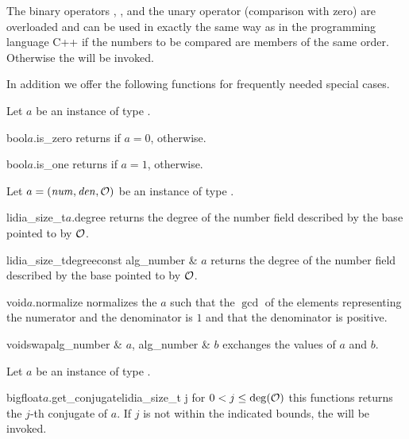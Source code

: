 The binary operators \code{==}, \code{!=}, and the unary operator \code{!}  (comparison with
zero) are overloaded and can be used in exactly the same way as in the programming language C++
if the numbers to be compared are members of the same order.  Otherwise the \LEH will be
invoked.

In addition we offer the following functions for frequently needed special cases.

Let $a$ be an instance of type .

\begin{cfcode}{bool}{$a$.is_zero}{}
  returns \TRUE if $a = 0$, \FALSE otherwise.
\end{cfcode}

\begin{cfcode}{bool}{$a$.is_one}{}
  returns \TRUE if $a = 1$, \FALSE otherwise.
\end{cfcode}



\BASIC

Let $a = (\mathit{num}, \mathit{den}, \mathcal{O})$ be an instance of type .

\begin{cfcode}{lidia_size_t}{$a$.degree}{}
  returns the degree of the number field described by the base pointed to by $\mathcal{O}$.
\end{cfcode}

\begin{fcode}{lidia_size_t}{degree}{const alg_number & $a$}
  returns the degree of the number field described by the base pointed to by $\mathcal{O}$.
\end{fcode}

\begin{fcode}{void}{$a$.normalize}{}
  normalizes the  $a$ such that the $\gcd$ of the elements representing the
  numerator and the denominator is $1$ and that the denominator is positive.
\end{fcode}

\begin{fcode}{void}{swap}{alg_number & $a$, alg_number & $b$}
  exchanges the values of $a$ and $b$.
\end{fcode}



\HIGH

Let $a$ be an instance of type .

\begin{cfcode}{bigfloat}{$a$.get_conjugate}{lidia_size_t j}
  for $0 < j \leq \deg(\mathcal{O})$ this functions returns the $j$-th conjugate of $a$.  If $j$ is not
  within the indicated bounds, the \LEH will be invoked.
\end{cfcode}

